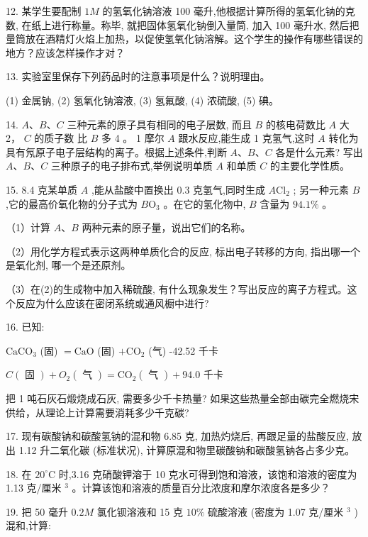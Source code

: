 \documentclass[10pt]{article}
\begin{document}
12. 某学生要配制 \({1M}\) 的氢氧化钠溶液 100 毫升,他根据计算所得的氢氧化钠的克数, 在纸上进行称量。称毕, 就把固体氢氧化钠倒入量筒, 加入 100 毫升水, 然后把量筒放在酒精灯火焰上加热，以促使氢氧化钠溶解。这个学生的操作有哪些错误的地方？应该怎样操作才对？

13. 实验室里保存下列药品时的注意事项是什么？说明理由。

(1) 金属钠, (2) 氢氧化钠溶液, (3) 氢氟酸, (4) 浓硫酸, (5) 碘。

14. \(A\text{、}B\text{、}C\) 三种元素的原子具有相同的电子层数, 而且 \(B\) 的核电荷数比 \(A\) 大 2， \(C\) 的质子数 比 \(B\) 多 4 。 1 摩尔 \(A\) 跟水反应,能生成 1 克氢气,这时 \(A\) 转化为具有氖原子电子层结构的离子。根据上述条件,判断 \(A\text{、}B\text{、}C\) 各是什么元素? 写出 \(A\text{、}B\text{、}C\) 三种原子的电子排布式,举例说明单质 \(A\) 和单质 \(C\) 的主要化学性质。

15. 8.4 克某单质 \(A\) ,能从盐酸中置换出 0.3 克氢气,同时生成 \(A{\mathrm{{Cl}}}_{2}\) ; 另一种元素 \(B\) ,它的最高价氧化物的分子式为 \(B{\mathrm{O}}_{3}\) 。在它的氢化物中, \(B\) 含量为 \({94.1}\%\) 。

（1）计算 \(A\text{、}B\) 两种元素的原子量，说出它们的名称。

（2）用化学方程式表示这两种单质化合的反应, 标出电子转移的方向, 指出哪一个是氧化剂, 哪一个是还原剂。

（3）在(2)的生成物中加入稀硫酸, 有什么现象发生？写出反应的离子方程式。这个反应为什么应该在密闭系统或通风橱中进行?

16. 已知:

\({\mathrm{{CaCO}}}_{3}\) (固) \(= \mathrm{{CaO}}\) (固) \(+ {\mathrm{{CO}}}_{2}\) (气) -42.52 千卡

\(C\left( \text{ 固 }\right) + {O}_{2}\left( \text{ 气 }\right) = {\mathrm{{CO}}}_{2}\left( \text{ 气 }\right) + {94.0}\) 千卡

把 1 吨石灰石煅烧成石灰, 需要多少千卡热量? 如果这些热量全部由碳完全燃烧宋供给，从理论上计算需要消耗多少千克碳?

17. 现有碳酸钠和碳酸氢钠的混和物 6.85 克, 加热灼烧后, 再跟足量的盐酸反应, 放出 1.12 升二氧化碳 (标准状况), 计算原混和物里碳酸钠和碳酸氢钠各占多少克。

18. 在 \({20}^{ \circ }\mathrm{C}\) 时,3.16 克硝酸钾溶于 10 克水可得到饱和溶液，该饱和溶液的密度为 1.13 克/厘米 \({}^{3}\) 。计算该饱和溶液的质量百分比浓度和摩尔浓度各是多少？

19. 把 50 毫升 \({0.2M}\) 氯化钡溶液和 15 克 \({10}\%\) 硫酸溶液 (密度为 1.07 克/厘米 \({}^{3}\) ) 混和,计算:
\end{document}

